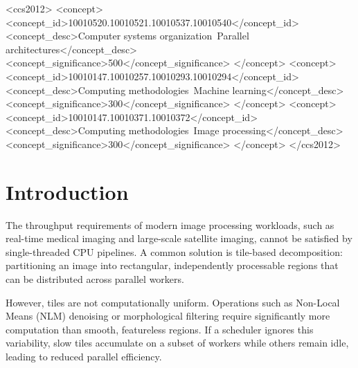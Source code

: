\documentclass[acmsmall]{acmart}
\begin{document}
\begin{CCSXML}
<ccs2012>
<concept>
<concept_id>10010520.10010521.10010537.10010540</concept_id>
<concept_desc>Computer systems organization~Parallel architectures</concept_desc>
<concept_significance>500</concept_significance>
</concept>
<concept>
<concept_id>10010147.10010257.10010293.10010294</concept_id>
<concept_desc>Computing methodologies~Machine learning</concept_desc>
<concept_significance>300</concept_significance>
</concept>
<concept>
<concept_id>10010147.10010371.10010372</concept_id>
<concept_desc>Computing methodologies~Image processing</concept_desc>
<concept_significance>300</concept_significance>
</concept>
</ccs2012>
\end{CCSXML}



\maketitle

\section{Introduction}

The throughput requirements of modern image processing workloads, such as real-time medical imaging and large-scale satellite imaging, cannot be satisfied by single-threaded CPU pipelines. 
A common solution is tile-based decomposition: partitioning an image into rectangular, independently processable regions that can be distributed across parallel workers.

However, tiles are not computationally uniform. 
Operations such as Non-Local Means (NLM) denoising or morphological filtering require significantly more computation than smooth, featureless regions. 
If a scheduler ignores this variability, slow tiles accumulate on a subset of workers while others remain idle, leading to reduced parallel efficiency.
\end{document}
